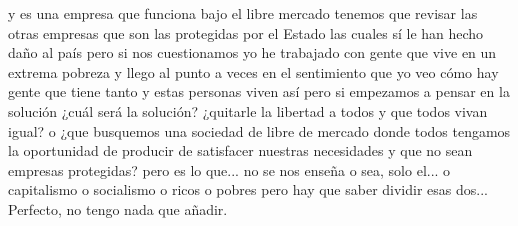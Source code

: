 y es una empresa que funciona bajo el libre mercado tenemos que revisar las otras empresas
que son las protegidas por el Estado las cuales sí le han hecho daño al país pero si nos cuestionamos
yo he trabajado con gente que vive en un extrema pobreza y llego al punto a veces en el sentimiento que yo veo
cómo hay gente que tiene tanto y estas personas viven así pero si empezamos a pensar en la solución
¿cuál será la solución? ¿quitarle la libertad a todos y que todos vivan igual?
o ¿que busquemos una sociedad de libre de mercado donde todos tengamos la oportunidad de producir
de satisfacer nuestras necesidades y que no sean empresas protegidas? pero es lo que... no se nos enseña
o sea, solo el... o capitalismo o socialismo o ricos o pobres pero hay que saber dividir esas dos...
Perfecto, no tengo nada que añadir.
